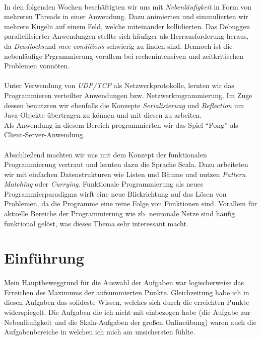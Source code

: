 \documentclass[10pt, a4paper]{article}
\begin{document}
\paragraph*{}
In den folgenden Wochen beschäftigten wir uns mit \textit{Nebenläufigkeit} in Form von mehreren Threads in einer Anwendung. Dazu animierten und simmulierten wir mehrere Kugeln auf einem Feld, welche miteinander kollidierten. Das Debuggen parallelilsierter Anwendungen stellte sich häufiger als Herrausforderung heraus, da \textit{Deadlocks}und \textit{race conditions} schwierig zu finden sind. Dennoch ist die nebenläufige Prgrammierung vorallem bei rechenintensiven und zeitkritischen Problemen vonnöten.\par

\paragraph*{}
Unter Verwendung von \textit{UDP/TCP} als Netzwerkprotokolle, lernten wir das Programmieren verteilter Anwendungen bzw. Netzwerkrogrammierung. Im Zuge dessen benutzren wir ebenfalls die Konzepte \textit{Serialisierung} und \textit{Reflection} um Java-Objekte übertragen zu können und mit diesen zu arbeiten.\\
Als Anwendung in diesem Bereich programmierten wir das Spiel \enquote{Pong} als Client-Server-Anwendung.\par

\paragraph*{}
Abschließend machten wir uns mit dem Konzept der funktionalen Programmierung vertraut und lernten dazu die Sprache Scala. Dazu arbeiteten wir mit einfachen Datenstrukturen wie Listen und Bäume und nutzen \textit{Pattern Matching} oder \textit{Currying}. Funktionale Programmierung als neues Programmierparadigma wirft eine neue Blickrichtung auf das Lösen von Problemen, da die Programme eine reine Folge von Funktionen sind. Vorallem für aktuelle Bereiche der Programmierung wie zb. neuronale Netze sind häufig funktional gelöst, was dieses Thema sehr interessant macht.\par


\section*{Einführung}
\paragraph*{}
Mein Hauptbeweggrund für die Auswahl der Aufgaben war logischerweise das Erreichen des Maximums der aufsummierten Punkte. Gleichzeitung habe ich in diesen Aufgaben das solideste Wissen, welches sich durch die erreichten Punkte widerspiegelt. Die Aufgaben die ich nicht mit einbezogen habe (die Aufgabe zur Nebenläufigkeit und die Skala-Aufgaben der großen Onlineübung) waren auch die Aufgabenbereiche in welchen ich mich am unsichersten fühlte. \par
\end{document}

